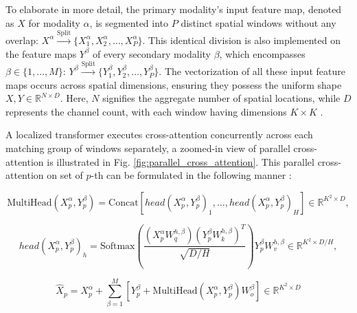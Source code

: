\documentclass[report.tex]{subfiles}
\begin{document}
    To elaborate in more detail, the primary modality's input feature map, denoted as \( X \) for modality \( \alpha \), is segmented into \( P \) distinct spatial windows without any overlap: \( X^\alpha \xrightarrow{\text{Split}} \{X^\alpha_1, X^\alpha_2, \ldots, X^\alpha_P\} \). This identical division is also implemented on the feature maps \( Y^\beta \) of every secondary modality \( \beta \), which encompasses \( \beta \in \{1, \ldots, M\} \): \( Y^\beta \xrightarrow{\text{Split}} \{Y^\beta_1, Y^\beta_2, \ldots, Y^\beta_P\} \). The vectorization of all these input feature maps occurs across spatial dimensions, ensuring they possess the uniform shape \( X, Y \in \mathbb{R}^{N \times D} \). Here, \( N \) signifies the aggregate number of spatial locations, while \( D \) represents the channel count, with each window having dimensions \( K \times K \) \cite{broedermann2022hrfuser}.


    A localized transformer executes cross-attention concurrently across each matching group of windows separately, a zoomed-in view of parallel cross-attention is illustrated in Fig. \ref{fig:parallel_cross_attention}. This parallel cross-attention on set of \( p \)-th can be formulated in the following manner \cite{broedermann2022hrfuser}:

    \begin{equation}
        \text{MultiHead}(X^{\alpha}_p, Y^{\beta}_p) = \text{Concat}[head(X^{\alpha}_p, Y^{\beta}_p)_1, \ldots, head(X^{\alpha}_p, Y^{\beta}_p)_H] \in \mathbb{R}^{K^2 \times D},
        \end{equation}
        
        \begin{equation}
        head(X^{\alpha}_p, Y^{\beta}_p)_h = \text{Softmax}\left( \frac{(X^{\alpha}_p W^{h,\beta}_q)(Y^{\beta}_p W^{h,\beta}_k)^T}{\sqrt{D/H}} \right) Y^{\beta}_p W^{h,\beta}_v \in \mathbb{R}^{K^2 \times D/H},
        \end{equation}
        
        \begin{equation}
        \hat{X}_p = X^{\alpha}_p + \sum_{\beta=1}^{M} \left[ Y^{\beta}_p + \text{MultiHead}(X^{\alpha}_p, Y^{\beta}_p)W^{\beta}_o \right] \in \mathbb{R}^{K^2 \times D}
        \end{equation}
        
\end{document}
